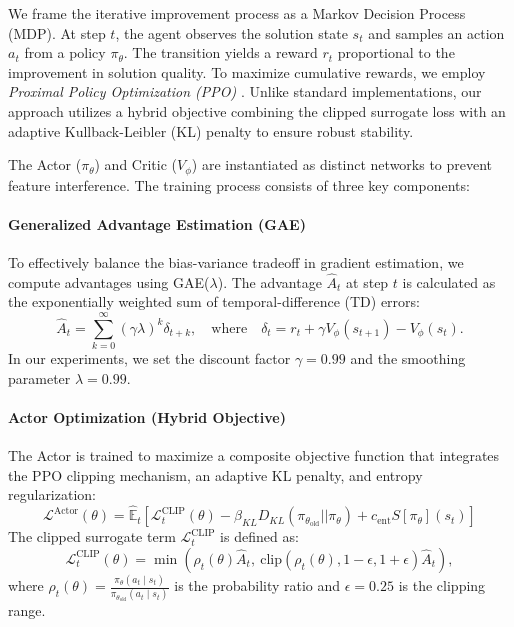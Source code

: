 \documentclass[letterpaper]{article} %
\begin{document}
We frame the iterative improvement process as a Markov Decision Process (MDP). At step $t$, the agent observes the solution state $s_t$ and samples an action $a_t$ from a policy $\pi_\theta$. The transition yields a reward $r_t$ proportional to the improvement in solution quality. To maximize cumulative rewards, we employ \textit{Proximal Policy Optimization (PPO)} \citep{schulman_proximal_2017}. Unlike standard implementations, our approach utilizes a hybrid objective combining the clipped surrogate loss with an adaptive Kullback-Leibler (KL) penalty to ensure robust stability.

The Actor ($\pi_{\theta}$) and Critic ($V_{\phi}$) are instantiated as distinct networks to prevent feature interference. The training process consists of three key components:

\paragraph{Generalized Advantage Estimation (GAE)}
To effectively balance the bias-variance tradeoff in gradient estimation, we compute advantages using GAE($\lambda$). The advantage $\hat{A}_t$ at step $t$ is calculated as the exponentially weighted sum of temporal-difference (TD) errors:
\begin{equation}
    \hat{A}_t = \sum_{k=0}^{\infty} (\gamma \lambda)^k \delta_{t+k}, \quad \text{where} \quad \delta_t = r_t + \gamma V_{\phi}(s_{t+1}) - V_{\phi}(s_t).
\end{equation}
In our experiments, we set the discount factor $\gamma=0.99$ and the smoothing parameter $\lambda=0.99$.

\paragraph{Actor Optimization (Hybrid Objective)}
The Actor is trained to maximize a composite objective function that integrates the PPO clipping mechanism, an adaptive KL penalty, and entropy regularization:
\begin{equation}
    \mathcal{L}^{\text{Actor}}(\theta) = \hat{\mathbb{E}}_t \left[ \mathcal{L}^{\text{CLIP}}_t(\theta) - \beta_{KL} D_{KL}(\pi_{\theta_{\text{old}}} || \pi_{\theta}) + c_\text{ent} S[\pi_{\theta}](s_t) \right]
\end{equation}
The clipped surrogate term $\mathcal{L}^{\text{CLIP}}_t$ is defined as:
\begin{equation}
    \mathcal{L}^{\text{CLIP}}_t(\theta) = \min \left( \rho_t(\theta) \hat{A}_t, \ \text{clip}(\rho_t(\theta), 1 - \epsilon, 1 + \epsilon) \hat{A}_t \right),
\end{equation}
where $\rho_t(\theta) = \frac{\pi_{\theta}(a_t \mid s_t)}{\pi_{\theta_{\text{old}}}(a_t \mid s_t)}$ is the probability ratio and $\epsilon=0.25$ is the clipping range.
\end{document}
